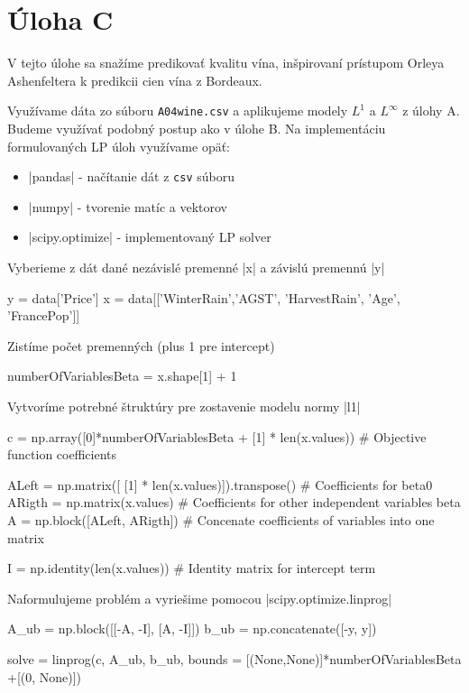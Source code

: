 \documentclass[12pt,oneside,a4paper,slovak]{article}
\begin{document}
   

\section*{Úloha C}
V tejto úlohe sa snažíme predikovať kvalitu vína, inšpirovaní prístupom Orleya Ashenfeltera k predikcii cien vína z Bordeaux.

Využívame dáta zo súboru \verb|A04wine.csv| a aplikujeme modely $L^1$ a $L^{\infty}$ z úlohy A. Budeme využívať podobný postup ako v úlohe B. Na implementáciu formulovaných LP úloh využívame opäť:
\begin{itemize}
	\item \pyth|pandas| - načítanie dát z \verb|csv| súboru
	\item \pyth|numpy| - tvorenie matíc a vektorov
	\item \pyth|scipy.optimize| - implementovaný LP solver
\end{itemize}

Vyberieme z dát dané nezávislé premenné \pyth|x| a závislú premennú \pyth|y|

\begin{python}
y = data['Price']
x = data[['WinterRain','AGST', 'HarvestRain', 'Age', 'FrancePop']]
\end{python}

Zistíme počet premenných (plus 1 pre intercept)

\begin{python}
numberOfVariablesBeta = x.shape[1] + 1
\end{python}

Vytvoríme potrebné štruktúry pre zostavenie modelu normy \pyth|l1|

\begin{python}
c = np.array([0]*numberOfVariablesBeta + [1] * len(x.values)) # Objective function coefficients

ALeft = np.matrix([ [1] * len(x.values)]).transpose() # Coefficients for beta0
ARigth = np.matrix(x.values) # Coefficients for other independent variables beta
A = np.block([ALeft, ARigth]) # Concenate coefficients of variables into one matrix

I = np.identity(len(x.values)) # Identity matrix for intercept term
\end{python}

Naformulujeme problém a vyriešime pomocou \pyth|scipy.optimize.linprog|

\begin{python}
A_ub = np.block([[-A, -I], [A, -I]])
b_ub = np.concatenate([-y, y])

solve = linprog(c, A_ub, b_ub, bounds = [(None,None)]*numberOfVariablesBeta +[(0, None)])
\end{python}
\end{document}
